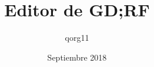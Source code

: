 \documentclass[a4paper,12pt]{book}
\begin{document}
\author{qorg11}
\title{Editor de GD;RF}
\date{Septiembre 2018}

\frontmatter
\maketitle
\tableofcontents

\mainmatter


\backmatter
\end{document}
